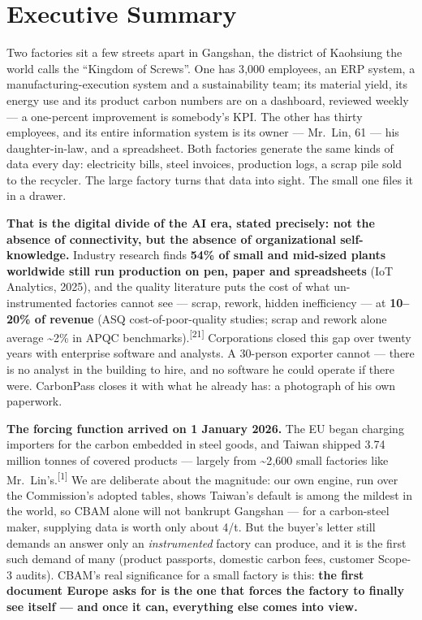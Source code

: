 \documentclass[11pt]{article}
\newcommand{\euro}{\texteuro}
\begin{document}
\clearpage
\section{Executive Summary}

Two factories sit a few streets apart in Gangshan, the district of Kaohsiung the world calls the ``Kingdom of Screws''. One has 3{,}000 employees, an ERP system, a manufacturing-execution system and a sustainability team; its material yield, its energy use and its product carbon numbers are on a dashboard, reviewed weekly --- a one-percent improvement is somebody's KPI. The other has thirty employees, and its entire information system is its owner --- Mr.\ Lin, 61 --- his daughter-in-law, and a spreadsheet. Both factories generate the same kinds of data every day: electricity bills, steel invoices, production logs, a scrap pile sold to the recycler. The large factory turns that data into sight. The small one files it in a drawer.

\begin{keybox}
\textbf{That is the digital divide of the AI era, stated precisely: not the absence of connectivity, but the absence of organizational self-knowledge.} Industry research finds \textbf{54\% of small and mid-sized plants worldwide still run production on pen, paper and spreadsheets} (IoT Analytics, 2025), and the quality literature puts the cost of what un-instrumented factories cannot see --- scrap, rework, hidden inefficiency --- at \textbf{10--20\% of revenue} (ASQ cost-of-poor-quality studies; scrap and rework alone average \textasciitilde2\% in APQC benchmarks).\textsuperscript{[21]} Corporations closed this gap over twenty years with enterprise software and analysts. A 30-person exporter cannot --- there is no analyst in the building to hire, and no software he could operate if there were. CarbonPass closes it with what he already has: a photograph of his own paperwork.
\end{keybox}

\textbf{The forcing function arrived on 1 January 2026.} The EU began charging importers for the carbon embedded in steel goods, and Taiwan shipped 3.74 million tonnes of covered products --- largely from \textasciitilde2{,}600 small factories like Mr.\ Lin's.\textsuperscript{[1]} We are deliberate about the magnitude: our own engine, run over the Commission's adopted tables, shows Taiwan's default is among the mildest in the world, so CBAM alone will not bankrupt Gangshan --- for a carbon-steel maker, supplying data is worth only about \euro{}4/t. But the buyer's letter still demands an answer only an \emph{instrumented} factory can produce, and it is the first such demand of many (product passports, domestic carbon fees, customer Scope-3 audits). CBAM's real significance for a small factory is this: \textbf{the first document Europe asks for is the one that forces the factory to finally see itself --- and once it can, everything else comes into view.}
\end{document}
